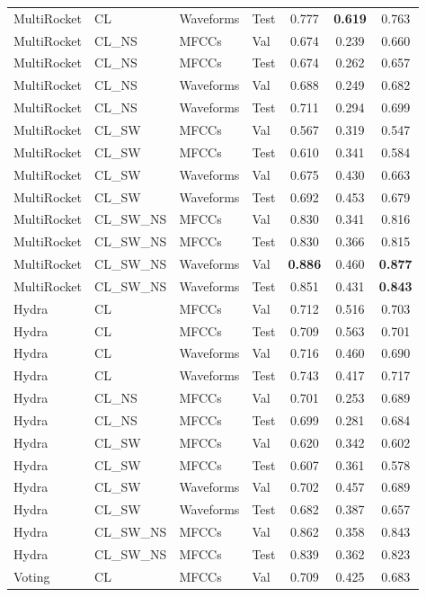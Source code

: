 \begin{longtable}{|l|l|l|l|c|c|c|}
MultiRocket & CL & Waveforms & Test & 0.777 & \textbf{0.619} & 0.763 \\
MultiRocket & CL\_NS & MFCCs & Val & 0.674 & 0.239 & 0.660 \\
MultiRocket & CL\_NS & MFCCs & Test & 0.674 & 0.262 & 0.657 \\
MultiRocket & CL\_NS & Waveforms & Val & 0.688 & 0.249 & 0.682 \\
MultiRocket & CL\_NS & Waveforms & Test & 0.711 & 0.294 & 0.699 \\
MultiRocket & CL\_SW & MFCCs & Val & 0.567 & 0.319 & 0.547 \\
MultiRocket & CL\_SW & MFCCs & Test & 0.610 & 0.341 & 0.584 \\
MultiRocket & CL\_SW & Waveforms & Val & 0.675 & 0.430 & 0.663 \\
MultiRocket & CL\_SW & Waveforms & Test & 0.692 & 0.453 & 0.679 \\
MultiRocket & CL\_SW\_NS & MFCCs & Val & 0.830 & 0.341 & 0.816 \\
MultiRocket & CL\_SW\_NS & MFCCs & Test & 0.830 & 0.366 & 0.815 \\
MultiRocket & CL\_SW\_NS & Waveforms & Val & \textbf{0.886} & 0.460 & \textbf{0.877} \\
MultiRocket & CL\_SW\_NS & Waveforms & Test & 0.851 & 0.431 & \textbf{0.843} \\
Hydra & CL & MFCCs & Val & 0.712 & 0.516 & 0.703 \\
Hydra & CL & MFCCs & Test & 0.709 & 0.563 & 0.701 \\
Hydra & CL & Waveforms & Val & 0.716 & 0.460 & 0.690 \\
Hydra & CL & Waveforms & Test & 0.743 & 0.417 & 0.717 \\
Hydra & CL\_NS & MFCCs & Val & 0.701 & 0.253 & 0.689 \\
Hydra & CL\_NS & MFCCs & Test & 0.699 & 0.281 & 0.684 \\
Hydra & CL\_SW & MFCCs & Val & 0.620 & 0.342 & 0.602 \\
Hydra & CL\_SW & MFCCs & Test & 0.607 & 0.361 & 0.578 \\
Hydra & CL\_SW & Waveforms & Val & 0.702 & 0.457 & 0.689 \\
Hydra & CL\_SW & Waveforms & Test & 0.682 & 0.387 & 0.657 \\
Hydra & CL\_SW\_NS & MFCCs & Val & 0.862 & 0.358 & 0.843 \\
Hydra & CL\_SW\_NS & MFCCs & Test & 0.839 & 0.362 & 0.823 \\
Voting & CL & MFCCs & Val & 0.709 & 0.425 & 0.683 \\

\end{longtable}
